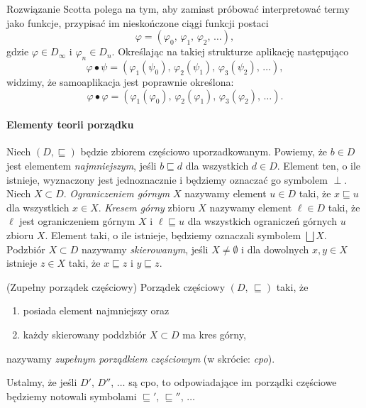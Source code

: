 Rozwiązanie Scotta polega na tym, aby zamiast próbować interpretować termy jako funkcje, przypisać im nieskończone ciągi funkcji postaci 
\[
  \varphi = (\varphi_0,\,\varphi_1,\,\varphi_2,\,\dots),
\]
gdzie \(\varphi \in D_\infty\) i \(\varphi_n\in D_n\). Określając na takiej strukturze aplikację następująco
\[
  \varphi\bullet\psi = (\varphi_1(\psi_0),\,\varphi_2(\psi_1),\,\varphi_3(\psi_2),\,\dots),
\]
widzimy, że samoaplikacja jest poprawnie określona: 
\[
  \varphi\bullet\varphi = (\varphi_1(\varphi_0),\,\varphi_2(\varphi_1),\,\varphi_3(\varphi_2),\,\dots).
\]

\paragraph{Elementy teorii porządku} 
Niech \((D,\sqsubseteq)\) będzie zbiorem częściowo uporzadkowanym. Powiemy, że \(b\in D\) jest elementem \emph{najmniejszym}, jeśli \(b\sqsubseteq d\) dla wszystkich \(d\in D\). Element ten, o ile istnieje, wyznaczony jest jednoznacznie i będziemy oznaczać go symbolem \(\perp\). Niech \(X\subset D\). \emph{Ograniczeniem górnym} \(X\) nazywamy element \(u\in D\) taki, że \(x\sqsubseteq u\) dla wszystkich \(x\in X\). \emph{Kresem górny} zbioru \(X\) nazywamy element \(\ell\in D\) taki, że \(\ell\) jest ograniczeniem górnym \(X\) i \(\ell\sqsubseteq u\) dla wszystkich ograniczeń górnych \(u\) zbioru \(X\). Element taki, o ile istnieje, będziemy oznaczali symbolem \(\bigsqcup X\). Podzbiór \(X\subset D\) nazywamy \emph{skierowanym}, jeśli \(X\neq\emptyset\) i dla dowolnych \(x, y\in X\) istnieje \(z\in X\) taki, że \(x\sqsubseteq z\) i \(y\sqsubseteq z\). 

\begin{definicja}(Zupełny porządek częściowy) %
Porządek częściowy \((D,\,\sqsubseteq)\) taki, że
\begin{enumerate}[label={(\alph*)}, ref={(\alph*)}]
  \setlength\itemsep{0em}
  \item posiada element najmniejszy oraz
  \item każdy skierowany poddzbiór \(X\subset D\) ma kres górny,
\end{enumerate}
  nazywamy \emph{zupełnym porządkiem częściowym} (w skrócie: \emph{cpo}).
\end{definicja}

Ustalmy, że jeśli \(D'\), \(D''\), \(\dots\)  są cpo, to odpowiadające im porządki częściowe będziemy notowali symbolami \(\sqsubseteq'\), \(\sqsubseteq''\), \(\dots\)

